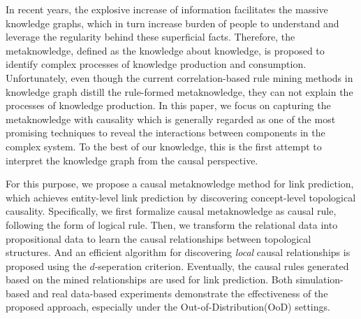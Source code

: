 In recent years, the explosive increase of information facilitates the massive knowledge graphs, which in turn increase burden of people to understand and leverage the regularity behind these superficial facts.
Therefore, the metaknowledge, defined as the knowledge about knowledge, is proposed to identify complex processes of knowledge production and consumption.
Unfortunately, even though the current correlation-based rule mining methods in knowledge graph distill the rule-formed metaknowledge, they can not explain the processes of knowledge production.
In this paper, we focus on capturing the metaknowledge with causality which is generally regarded as one of the most promising techniques to reveal the interactions between components in the complex system.
To the best of our knowledge, this is the first attempt to interpret the knowledge graph from the causal perspective.


For this purpose, we propose a causal metaknowledge method for link prediction, which achieves entity-level link prediction by discovering concept-level topological causality. 
Specifically, we first formalize causal metaknowledge as causal rule, following the form of logical rule.
Then, we transform the relational data into propositional data to learn the causal relationships between topological structures.
And an efficient algorithm for discovering \emph{local} causal relationships is proposed using the $d$-seperation criterion.
Eventually, the causal rules generated based on the mined relationships are used for link prediction.
Both simulation-based and real data-based experiments demonstrate the effectiveness of the proposed approach, especially under the Out-of-Distribution(OoD) settings.